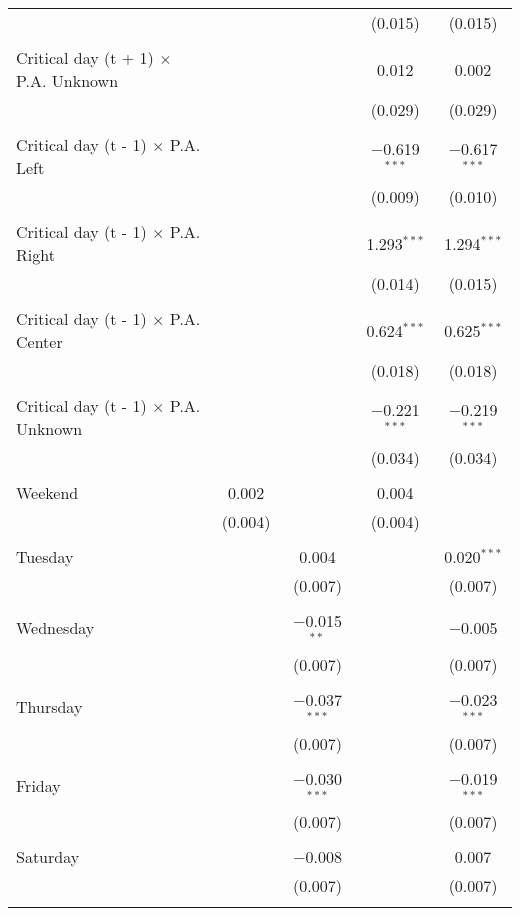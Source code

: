 \documentclass[
]{article}
\begin{document}
\begin{table}[!htbp]
{\begin{tabular}{@{\extracolsep{5pt}}lcccc}
  &  &  & (0.015) & (0.015) \\ 
  & & & & \\ 
 Critical day (t + 1) $\times$ P.A. Unknown &  &  & 0.012 & 0.002 \\ 
  &  &  & (0.029) & (0.029) \\ 
  & & & & \\ 
 Critical day (t - 1) $\times$ P.A. Left &  &  & $-$0.619$^{***}$ & $-$0.617$^{***}$ \\ 
  &  &  & (0.009) & (0.010) \\ 
  & & & & \\ 
 Critical day (t - 1) $\times$ P.A. Right &  &  & 1.293$^{***}$ & 1.294$^{***}$ \\ 
  &  &  & (0.014) & (0.015) \\ 
  & & & & \\ 
 Critical day (t - 1) $\times$ P.A. Center &  &  & 0.624$^{***}$ & 0.625$^{***}$ \\ 
  &  &  & (0.018) & (0.018) \\ 
  & & & & \\ 
 Critical day (t - 1) $\times$ P.A. Unknown &  &  & $-$0.221$^{***}$ & $-$0.219$^{***}$ \\ 
  &  &  & (0.034) & (0.034) \\ 
  & & & & \\ 
 Weekend & 0.002 &  & 0.004 &  \\ 
  & (0.004) &  & (0.004) &  \\ 
  & & & & \\ 
 Tuesday &  & 0.004 &  & 0.020$^{***}$ \\ 
  &  & (0.007) &  & (0.007) \\ 
  & & & & \\ 
 Wednesday &  & $-$0.015$^{**}$ &  & $-$0.005 \\ 
  &  & (0.007) &  & (0.007) \\ 
  & & & & \\ 
 Thursday &  & $-$0.037$^{***}$ &  & $-$0.023$^{***}$ \\ 
  &  & (0.007) &  & (0.007) \\ 
  & & & & \\ 
 Friday &  & $-$0.030$^{***}$ &  & $-$0.019$^{***}$ \\ 
  &  & (0.007) &  & (0.007) \\ 
  & & & & \\ 
 Saturday &  & $-$0.008 &  & 0.007 \\ 
  &  & (0.007) &  & (0.007) \\ 
  & & & & \\ 

\end{tabular}}
\end{table}
\end{document}
